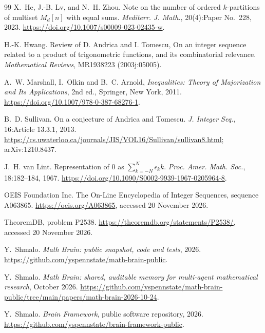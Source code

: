 \documentclass[11pt]{article}
\theoremstyle{remark}
\begin{document}
\begin{thebibliography}{99}
X.~He, J.-B. Lv, and N.~H. Zhou.
\newblock Note on the number of ordered $k$-partitions of multiset $M_d[n]$ with equal sums.
\newblock \emph{Mediterr. J. Math.}, 20(4):Paper No.~228, 2023.
\newblock \url{https://doi.org/10.1007/s00009-023-02435-w}.

H.-K. Hwang.
\newblock Review of D. Andrica and I. Tomescu, On an integer sequence related to a product of trigonometric functions, and its combinatorial relevance.
\newblock \emph{Mathematical Reviews}, MR1938223 (2003j:05005).

A.~W. Marshall, I.~Olkin and B.~C. Arnold, \emph{Inequalities: Theory of Majorization and Its Applications}, 2nd ed., Springer, New York, 2011.
\newblock \url{https://doi.org/10.1007/978-0-387-68276-1}.

B.~D. Sullivan.
\newblock On a conjecture of Andrica and Tomescu.
\newblock \emph{J. Integer Seq.}, 16:Article 13.3.1, 2013.
\newblock \url{https://cs.uwaterloo.ca/journals/JIS/VOL16/Sullivan/sullivan8.html}; arXiv:1210.8437.

J.~H. van Lint.
\newblock Representation of $0$ as $\sum_{k=-N}^{N}\epsilon_k k$.
\newblock \emph{Proc. Amer. Math. Soc.}, 18:182--184, 1967.
\newblock \url{https://doi.org/10.1090/S0002-9939-1967-0205964-8}.

OEIS Foundation Inc.
\newblock The On-Line Encyclopedia of Integer Sequences, sequence A063865.
\newblock \url{https://oeis.org/A063865}, accessed 20 November 2026.

TheoremDB, problem P2538.
\newblock \url{https://theoremdb.org/statements/P2538/}, accessed 20 November 2026.

Y.~Shmalo.
\newblock \emph{Math Brain: public snapshot, code and tests}, 2026.
\newblock \url{https://github.com/yspennstate/math-brain-public}.

Y.~Shmalo.
\newblock \emph{Math Brain: shared, auditable memory for multi-agent mathematical research}, October 2026.
\newblock \url{https://github.com/yspennstate/math-brain-public/tree/main/papers/math-brain-2026-10-24}.

Y.~Shmalo.
\newblock \emph{Brain Framework}, public software repository, 2026.
\newblock \url{https://github.com/yspennstate/brain-framework-public}.

\end{thebibliography}
\end{document}
